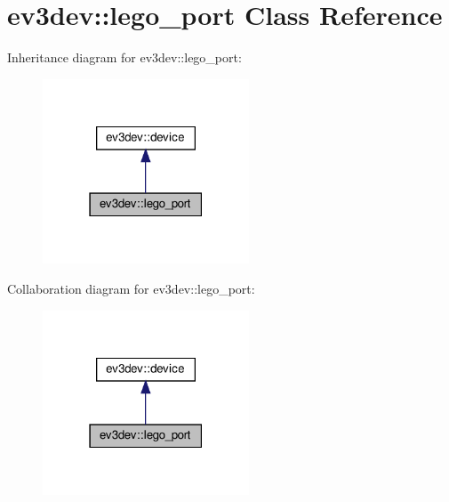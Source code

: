 \hypertarget{classev3dev_1_1lego__port}{}\section{ev3dev\+:\+:lego\+\_\+port Class Reference}
\label{classev3dev_1_1lego__port}


Inheritance diagram for ev3dev\+:\+:lego\+\_\+port\+:
\nopagebreak
\begin{figure}[H]
\begin{center}
\leavevmode
\includegraphics[width=174pt]{classev3dev_1_1lego__port__inherit__graph}
\end{center}
\end{figure}


Collaboration diagram for ev3dev\+:\+:lego\+\_\+port\+:
\nopagebreak
\begin{figure}[H]
\begin{center}
\leavevmode
\includegraphics[width=174pt]{classev3dev_1_1lego__port__coll__graph}
\end{center}
\end{figure}
